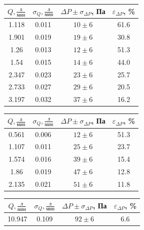 \documentclass[a4paper]{article}
\begin{document}
\begin{enumerate}
\begin{multicols}{2}
\begin{center}
    \begin{tabular}{|c|c|c|c|}
        \hline
         $Q, \frac{\text{л}}{\text{мин}} $& $\sigma_Q, \frac{\text{л}}{\text{мин}} $& $\Delta P \pm \sigma_{\Delta P}$, Па & $\varepsilon_{\Delta P}$, \% \\
        \hline
        1.118 & 0.011 & $10 \pm 6$ & 61.6 \\ \hline
        1.901 & 0.019 & $19 \pm 6$ & 30.8 \\ \hline
        1.26 & 0.013 & $12 \pm 6$ & 51.3 \\ \hline
        1.54 & 0.015 & $14 \pm 6$ & 44.0 \\ \hline
        2.347 & 0.023 & $23 \pm 6$ & 25.7 \\ \hline
        2.733 & 0.027 & $29 \pm 6$ & 20.5 \\ \hline
        3.197 & 0.032 & $37 \pm 6$ & 16.2 \\ \hline
    \end{tabular}
\end{center}
\vspace{1em}
\begin{center}
    \begin{tabular}{|c|c|c|c|}
        \hline
        $Q, \frac{\text{л}}{\text{мин}} $& $\sigma_Q, \frac{\text{л}}{\text{мин}} $& $\Delta P \pm \sigma_{\Delta P}$, Па & $\varepsilon_{\Delta P}$, \% \\
        \hline
        0.561 & 0.006 & $12 \pm 6$ & 51.3 \\ \hline
        1.107 & 0.011 & $25 \pm 6$ & 23.7 \\ \hline
        1.574 & 0.016 & $39 \pm 6$ & 15.4 \\ \hline
        1.86 & 0.019 & $47 \pm 6$ & 12.8 \\ \hline
        2.135 & 0.021 & $51 \pm 6$ & 11.8 \\ \hline
    \end{tabular}
\end{center}
\vspace{1em}
\begin{center}
    \begin{tabular}{|c|c|c|c|}
        \hline
        $Q, \frac{\text{л}}{\text{мин}}$ & $\sigma_Q, \frac{\text{л}}{\text{мин}}$ & $\Delta P \pm \sigma_{\Delta P}$, Па & $\varepsilon_{\Delta P}$, \% \\
        \hline
        10.947 & 0.109 & $92 \pm 6$ & 6.6 \\ \hline

\end{tabular}
\end{center}
\end{multicols}
\end{enumerate}
\end{document}
